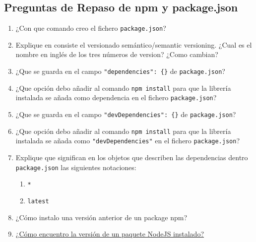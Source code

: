 \subsection{Preguntas de Repaso de npm y
package.json}\label{preguntas-de-repaso-de-npm-y-package.json}

\begin{enumerate}
\def\labelenumi{\arabic{enumi}.}
\item
  ¿Con que comando creo el fichero \texttt{package.json}?
\item
  Explique en consiste el versionado semántico/semantic versioning.
  ¿Cual es el nombre en inglés de los tres números de version? ¿Como
  cambian?
\item
  ¿Que se guarda en el campo \texttt{"dependencies": \{\}} de
  \texttt{package.json}?
\item
  ¿Que opción debo añadir al comando \texttt{npm install} para que la
  librería instalada se añada como dependencia en el fichero
  \texttt{package.json}?
\item
  ¿Que se guarda en el campo \texttt{"devDependencies": \{\}} de
  \texttt{package.json}?
\item
  ¿Que opción debo añadir al comando \texttt{npm install} para que la
  librería instalada se añada como \texttt{"devDependencies"} en el
  fichero \texttt{package.json}?
\item
  Explique que significan en los objetos que describen las dependencias
  dentro \texttt{package.json} las siguientes notaciones:

  \begin{enumerate}
  \def\labelenumii{\arabic{enumii}.}
  \item
    \texttt{*}
  \item
    \texttt{latest}
  \end{enumerate}
\item
  ¿Cómo instalo una versión anterior de un package npm?
\item
  \href{http://stackoverflow.com/questions/10972176/find-the-version-of-an-installed-npm-package}{¿Cómo
  encuentro la versión de un paquete NodeJS instalado?}
\end{enumerate}
